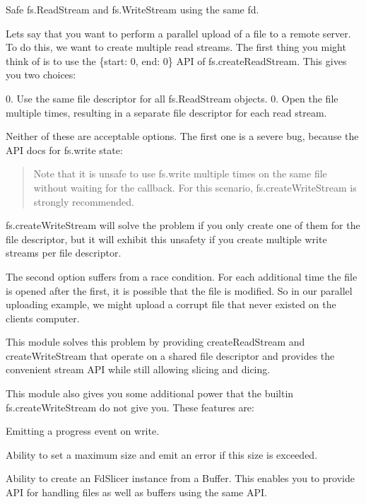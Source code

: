 \href{https://travis-ci.org/andrewrk/node-fd-slicer}{\tt }

Safe {\ttfamily fs.\+Read\+Stream} and {\ttfamily fs.\+Write\+Stream} using the same fd.

Let\textquotesingle{}s say that you want to perform a parallel upload of a file to a remote server. To do this, we want to create multiple read streams. The first thing you might think of is to use the {\ttfamily \{start\+: 0, end\+: 0\}} A\+PI of {\ttfamily fs.\+create\+Read\+Stream}. This gives you two choices\+:

0. Use the same file descriptor for all {\ttfamily fs.\+Read\+Stream} objects. 0. Open the file multiple times, resulting in a separate file descriptor for each read stream.

Neither of these are acceptable options. The first one is a severe bug, because the A\+PI docs for {\ttfamily fs.\+write} state\+:

\begin{quote}
Note that it is unsafe to use {\ttfamily fs.\+write} multiple times on the same file without waiting for the callback. For this scenario, {\ttfamily fs.\+create\+Write\+Stream} is strongly recommended. \end{quote}


{\ttfamily fs.\+create\+Write\+Stream} will solve the problem if you only create one of them for the file descriptor, but it will exhibit this unsafety if you create multiple write streams per file descriptor.

The second option suffers from a race condition. For each additional time the file is opened after the first, it is possible that the file is modified. So in our parallel uploading example, we might upload a corrupt file that never existed on the client\textquotesingle{}s computer.

This module solves this problem by providing {\ttfamily create\+Read\+Stream} and {\ttfamily create\+Write\+Stream} that operate on a shared file descriptor and provides the convenient stream A\+PI while still allowing slicing and dicing.

This module also gives you some additional power that the builtin {\ttfamily fs.\+create\+Write\+Stream} do not give you. These features are\+:


\begin{DoxyItemize}
\item Emitting a \textquotesingle{}progress\textquotesingle{} event on write.
\item Ability to set a maximum size and emit an error if this size is exceeded.
\item Ability to create an {\ttfamily Fd\+Slicer} instance from a {\ttfamily Buffer}. This enables you to provide A\+PI for handling files as well as buffers using the same A\+PI.
\end{DoxyItemize}

